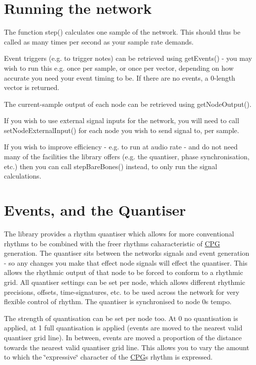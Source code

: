\section*{Running the network}

The function step() calculates one sample of the network. This should thus be called as many times per second as your sample rate demands.

Event triggers (e.\+g. to trigger notes) can be retrieved using get\+Events() -\/ you may wish to run this e.\+g. once per sample, or once per vector, depending on how accurate you need your event timing to be. If there are no events, a 0-\/length vector is returned.

The current-\/sample output of each node can be retrieved using get\+Node\+Output().

If you wish to use external signal inputs for the network, you will need to call set\+Node\+External\+Input() for each node you wish to send signal to, per sample.

If you wish to improve efficiency -\/ e.\+g. to run at audio rate -\/ and do not need many of the facilities the library offers (e.\+g. the quantiser, phase synchronisation, etc.) then you can call step\+Bare\+Bones() instead, to only run the signal calculations.

\section*{Events, and the Quantiser}

The library provides a rhythm quantiser which allows for more conventional rhythms to be combined with the freer rhythms caharacteristic of \mbox{\hyperlink{classCPG}{C\+PG}} generation. The quantiser sits between the network\textquotesingle{}s signals and event generation -\/ so any changes you make that effect node signals will effect the quantiser. This allows the rhythmic output of that node to be forced to conform to a rhythmic grid. All quantiser settings can be set per node, which allows different rhythmic precisions, offsets, time-\/signatures, etc. to be used across the network for very flexible control of rhythm. The quantiser is synchronised to node 0\textquotesingle{}s tempo.

The strength of quantisation can be set per node too. At 0 no quantisation is applied, at 1 full quantisation is applied (events are moved to the nearest valid quantiser grid line). In between, events are moved a proportion of the distance towards the nearest valid quantiser grid line. This allows you to vary the amount to which the \char`\"{}expressive\char`\"{} character of the \mbox{\hyperlink{classCPG}{C\+PG}}\textquotesingle{}s rhythm is expressed.


